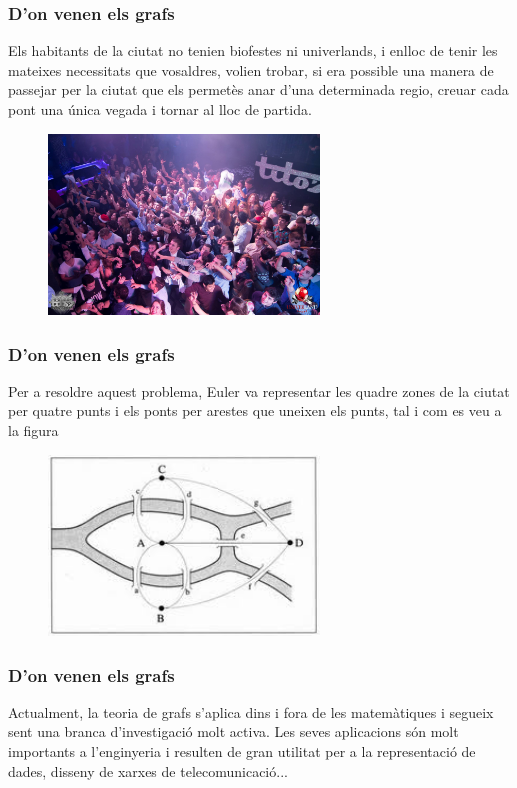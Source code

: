 \documentclass{beamer}
\begin{document}
\begin{frame}
\frametitle{D'on venen els grafs}
Els habitants de la ciutat no tenien biofestes ni univerlands, i enlloc de tenir les mateixes necessitats que vosaldres, volien trobar, si era possible una manera de passejar per la ciutat que els permetès anar d'una determinada regio, creuar cada pont una única vegada i tornar al lloc de partida. 
\begin{figure}[h]
 \label{fig:volum}
\centering
\includegraphics[height=4.8cm]{univerland}
\end{figure}
\end{frame}


\begin{frame}
\frametitle{D'on venen els grafs}
Per a resoldre aquest problema, Euler va representar les quadre zones de la ciutat per quatre punts i els ponts per arestes que uneixen els punts, tal i com es veu a la figura
\begin{figure}[h]
 \label{fig:volum}
\centering
\includegraphics[height=4.8cm]{kon3}
\end{figure}
\end{frame}


\begin{frame}
\frametitle{D'on venen els grafs}
Actualment, la teoria de grafs s'aplica dins i fora de les matemàtiques i segueix sent una branca d'investigació molt activa. Les seves aplicacions són molt importants a l'enginyeria i resulten de gran utilitat per a la representació de dades, disseny de xarxes de telecomunicació...
\end{frame}
\end{document}
